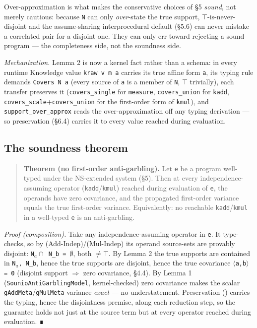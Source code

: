 \documentclass[sigplan,review,anonymous,10pt]{acmart}
\begin{document}
Over-approximation is what makes the conservative choices of §5 \emph{sound}, not merely cautious: because \texttt{N} can only \emph{over}-state the true support, \texttt{$\top$}-is-never-disjoint and the assume-sharing interprocedural default (§5.6) can never mistake a correlated pair for a disjoint one. They can only err toward rejecting a sound program --- the completeness side, not the soundness side.

\emph{Mechanization.} Lemma 2 is now a kernel fact rather than a schema: in  every runtime Knowledge value \texttt{kraw v m a} carries its true affine form \texttt{a}, its typing rule demands \texttt{Covers N a} (every source of \texttt{a} is a member of \texttt{N}, \texttt{$\top$} trivially), each transfer preserves it (\texttt{covers\_single} for \texttt{measure}, \texttt{covers\_union} for \texttt{kadd}, \texttt{covers\_scale}+\texttt{covers\_union} for the first-order form of \texttt{kmul}), and \texttt{support\_over\_approx} reads the over-approximation off any typing derivation --- so preservation (§6.4) carries it to every value reached during evaluation.

\subsection{The soundness theorem}

\begin{quote}
\textbf{Theorem (no first-order anti-garbling).} Let \texttt{e} be a program well-typed under the NS-extended system (§5). Then at every independence-assuming operator (\texttt{kadd}/\texttt{kmul}) reached during evaluation of \texttt{e}, the operands have zero covariance, and the propagated first-order variance equals the true first-order variance. Equivalently: no reachable \texttt{kadd}/\texttt{kmul} in a well-typed \texttt{e} is an anti-garbling.
\end{quote}

\emph{Proof (composition).} Take any independence-assuming operator in \texttt{e}. It type-checks, so by (Add-Indep)/(Mul-Indep) its operand source-sets are provably disjoint: \texttt{N$_{a}\cap$ N\_b = $\emptyset$}, both \texttt{$\neq\top$}. By Lemma 2 the true supports are contained in \texttt{N$_{a}$, N\_b}, hence the true supports are disjoint, hence the true covariance \texttt{$\langle$a,b$\rangle$ = 0} (disjoint support $\Rightarrow$ zero covariance, §4.4). By Lemma 1 (\texttt{SounioAntiGarblingModel}, kernel-checked) zero covariance makes the scalar \texttt{gAddMeta}/\texttt{gMulMeta} variance \emph{exact} --- no understatement. Preservation () carries the typing, hence the disjointness premise, along each reduction step, so the guarantee holds not just at the source term but at every operator reached during evaluation. ∎
\end{document}
